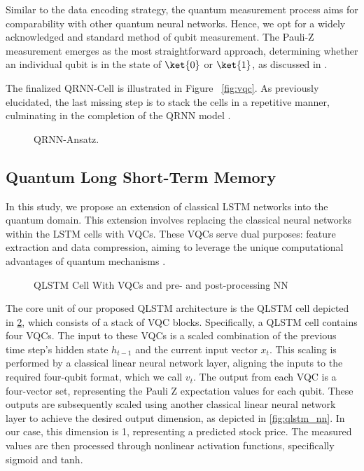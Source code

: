Similar to the data encoding strategy, the quantum measurement process aims for comparability with other quantum neural networks. Hence, we opt for a widely acknowledged and standard method of qubit measurement. The Pauli-Z measurement emerges as the most straightforward approach, determining whether an individual qubit is in the state of $\ket{0}$ or $\ket{1}$, as discussed in \cite{li2023quantum}.

The finalized QRNN-Cell is illustrated in Figure ~\ref{fig:vqc}. As previously elucidated, the last missing step is to stack the cells in a repetitive manner, culminating in the completion of the QRNN model \cite{bausch2020recurrent}.

\begin{figure}[!htbp]
\centering
\scalebox{0.45}{

}
\caption{QRNN-Ansatz.}
\label{fig:qrnn-ansatz}
\end{figure}

\subsection{Quantum Long Short-Term Memory}
In this study, we propose an extension of classical LSTM networks into the quantum domain. This extension involves replacing the classical neural networks within the LSTM cells with VQCs. These VQCs serve dual purposes: feature extraction and data compression, aiming to leverage the unique computational advantages of quantum mechanisms \cite{chen2020quantum}.

\begin{figure}[!htbp]
    \centering
    \caption{QLSTM Cell With VQCs and pre- and post-processing NN}
    \label{fig:qlstm}
\end{figure}

The core unit of our proposed QLSTM architecture is the QLSTM cell depicted in \ref{fig:qlstm}, which consists of a stack of VQC blocks. Specifically, a QLSTM cell contains four VQCs. The input to these VQCs is a scaled combination of the previous time step's hidden state \( h_{t-1} \) and the current input vector \( x_t \). This scaling is performed by a classical linear neural network layer, aligning the inputs to the required four-qubit format, which we call $v_t$. The output from each VQC is a four-vector set, representing the Pauli Z expectation values for each qubit. These outputs are subsequently scaled using another classical linear neural network layer to achieve the desired output dimension, as depicted in \ref{fig:qlstm_nn}. In our case, this dimension is 1, representing a predicted stock price. The measured values are then processed through nonlinear activation functions, specifically sigmoid and tanh.

